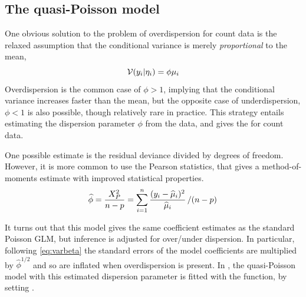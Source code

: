 \documentclass[11pt]{book}\usepackage[]{graphicx}\usepackage[]{color}
\begin{document}
\subsection{The quasi-Poisson model}\label{sec:glm-quasi}

One obvious solution to the problem of overdispersion for count data is the relaxed assumption
that the conditional variance is merely \emph{proportional} to the mean,
\begin{equation*}
\mathcal{V} (y_i | \eta_i) = \phi \mu_i
\end{equation*}
Overdispersion is the common case of $\phi > 1$, implying that the conditional variance
increases faster than the mean, but the opposite case of underdispersion, $\phi < 1$
is also possible, though relatively rare in practice.
This strategy entails estimating the dispersion parameter $\phi$ from the data,
and gives the  for count data.

One possible estimate is the residual deviance divided by degrees of freedom.
However, it is more common to use the Pearson statistics, that gives
a method-of-moments estimate with improved statistical properties.
\begin{equation*}
\widehat{\phi} = 
\frac{X^2_P}{n-p} = 
\sum_{i=1}^n \frac{(y_i - \widehat{\mu}_i)^2}{\widehat{\mu}_i} \left/ (n-p) \right.
\end{equation*}

It turns out that this model gives the same coefficient estimates as the standard
Poisson GLM, but inference is adjusted for over/under dispersion.
In particular, following \eqref{eq:varbeta}
the standard errors of the model coefficients are multiplied by 
$\widehat{\phi}^{1/2}$ and so are inflated when overdispersion is present.
In \R, the quasi-Poisson model with this estimated dispersion parameter is
fitted with the  function, by setting .
\end{document}

